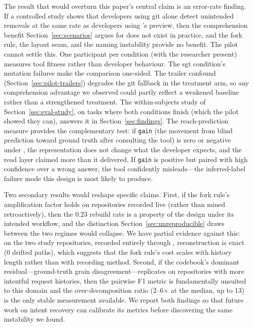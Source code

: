 The result that would overturn this paper's central claim is an error-rate
finding. If a controlled study shows that developers using git alone detect
unintended removals at the same rate as developers using \sgt{}'s preview, then
the comprehension benefit Section~\ref{sec:scenarios} argues for does not exist
in practice, and the fork rule, the layout seam, and the naming instability
provide no benefit. The
pilot cannot settle this. One participant per condition (with the
researcher present) measures tool fitness rather than developer behaviour.
The sgt condition's mutation failures make the comparison one-sided.
The trailer confound (Section~\ref{sec:pilot-trailers}) degrades the git fallback
in the treatment arm, so any comprehension advantage we observed could partly
reflect a weakened baseline rather than a strengthened treatment. The
within-subjects study of Section~\ref{sec:eval-study}, on tasks where both
conditions finish (which the pilot showed they can), answers it in
Section~\ref{sec:findings}. The reach-prediction measure provides the
complementary test: if \texttt{gain} (the movement from blind prediction toward
ground truth after consulting the tool) is zero or negative under \sgt{}, the
representation does not change what the developer expects, and the read layer
claimed more than it delivered. If \texttt{gain} is positive but paired with
high confidence over a wrong answer, the tool confidently misleads---the
inferred-label failure mode this design is most likely to produce.

Two secondary results would reshape specific claims. First, if the fork rule's
amplification factor holds on repositories recorded live (rather than mined
retroactively), then the 0.23 rebuild rate is a property of the design under its
intended workflow, and the distinction Section~\ref{sec:unreproducible} draws
between the two regimes would collapse. We have partial evidence against this: on the two study repositories,
recorded entirely through , reconstruction is exact (0 drifted
paths), which suggests that the fork rule's cost scales with history length
rather than with recording method. Second, if the codebook's dominant
residual---ground-truth grain disagreement---replicates on repositories with
more intentful request histories, then the pairwise F1 metric is fundamentally
unsuited to this domain and the over-decomposition ratio (2--6$\times$ at the
median, up to 13) is the only stable measurement available. We report both findings so that future work
on intent recovery can calibrate its metrics before discovering the same
instability we found.

